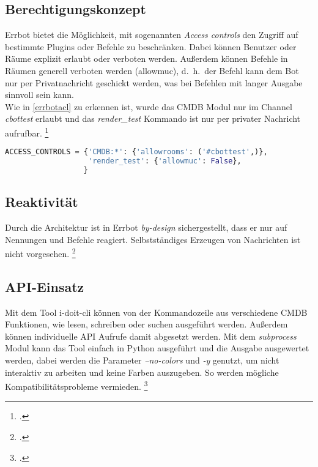 \subsection{Berechtigungskonzept}
Errbot bietet die Möglichkeit, mit sogenannten \textit{Access controls} den Zugriff auf bestimmte Plugins oder Befehle zu beschränken. Dabei können Benutzer oder Räume explizit erlaubt oder verboten werden. Außerdem können Befehle in Räumen generell verboten werden (allowmuc), d.~h.~der Befehl kann dem Bot nur per Privatnachricht geschickt werden, was bei Befehlen mit langer Ausgabe sinnvoll sein kann.\\
Wie in \autoref{errbotacl} zu erkennen ist, wurde das \acs{CMDB} Modul nur im Channel \textit{cbottest} erlaubt und das \textit{render\_test} Kommando ist nur per privater Nachricht aufrufbar.
\footcite[Vgl.][o. \pno]{errbot_2018_config-template}

\newpage
\begin{lstlisting}[language=python, label=errbotacl, caption=Errbot Access controls]
ACCESS_CONTROLS = {'CMDB:*': {'allowrooms': ('#cbottest',)},
                   'render_test': {'allowmuc': False},
                  }
\end{lstlisting}

\subsection{Reaktivität}
Durch die Architektur ist in Errbot \textit{by-design} sichergestellt, dass er nur auf Nennungen und Befehle reagiert. Selbstständiges Erzeugen von Nachrichten ist nicht vorgesehen.
\footcite[Vgl.][o. \pno]{errbot_2018_mentions}

\subsection{API-Einsatz}
Mit dem Tool i-doit-cli können von der Kommandozeile aus verschiedene \acs{CMDB} Funktionen, wie lesen, schreiben oder suchen ausgeführt werden. Außerdem können individuelle API Aufrufe damit abgesetzt werden. Mit dem \textit{subprocess} Modul kann das Tool einfach in Python ausgeführt und die Ausgabe ausgewertet werden, dabei werden die Parameter \textit{--no-colors} und \textit{-y} genutzt, um nicht interaktiv zu arbeiten und keine Farben auszugeben. So werden mögliche Kompatibilitätsprobleme vermieden.
\footcite[Vgl.][o. \pno]{Heisig_2019_idoitcli}

